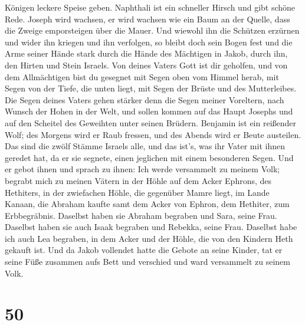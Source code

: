 Königen leckere Speise geben.  Naphthali ist ein
schneller Hirsch und gibt schöne Rede.  Joseph wird
wachsen, er wird wachsen wie ein Baum an der Quelle, dass die Zweige
emporsteigen über die Mauer.  Und wiewohl ihn die
Schützen erzürnen und wider ihn kriegen und ihn verfolgen,
 so bleibt doch sein Bogen fest und die Arme seiner Hände
stark durch die Hände des Mächtigen in Jakob, durch ihn, den Hirten und
Stein Israels.  Von deines Vaters Gott ist dir geholfen,
und von dem Allmächtigen bist du gesegnet mit Segen oben vom Himmel
herab, mit Segen von der Tiefe, die unten liegt, mit Segen der Brüste
und des Mutterleibes.  Die Segen deines Vaters gehen
stärker denn die Segen meiner Voreltern, nach Wunsch der Hohen in der
Welt, und sollen kommen auf das Haupt Josephs und auf den Scheitel des
Geweihten unter seinen Brüdern.  Benjamin ist ein
reißender Wolf; des Morgens wird er Raub fressen, und des Abends wird er
Beute austeilen.  Das sind die zwölf Stämme Israels alle,
und das ist's, was ihr Vater mit ihnen geredet hat, da er sie segnete,
einen jeglichen mit einem besonderen Segen.  Und er gebot
ihnen und sprach zu ihnen: Ich werde versammelt zu meinem Volk; begrabt
mich zu meinen Vätern in der Höhle auf dem Acker Ephrons, des Hethiters,
 in der zwiefachen Höhle, die gegenüber Mamre liegt, im
Lande Kanaan, die Abraham kaufte samt dem Acker von Ephron, dem
Hethiter, zum Erbbegräbnis.  Daselbst haben sie Abraham
begraben und Sara, seine Frau. Daselbst haben sie auch Isaak begraben
und Rebekka, seine Frau. Daselbst habe ich auch Lea begraben,
 in dem Acker und der Höhle, die von den Kindern Heth
gekauft ist.  Und da Jakob vollendet hatte die Gebote an
seine Kinder, tat er seine Füße zusammen aufs Bett und verschied und
ward versammelt zu seinem Volk.

\hypertarget{section-49}{%
\section{50}\label{section-49}}

